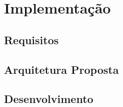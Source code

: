 \chapter{Implementação}
\label{cap4}

\section{Requisitos}

\section{Arquitetura Proposta}

\section{Desenvolvimento}